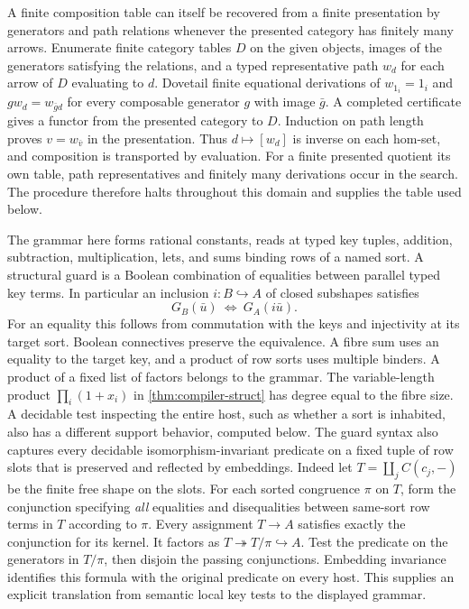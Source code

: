 \documentclass[11pt,a4paper]{article}
\theoremstyle{definition}
\theoremstyle{remark}\newaliascnt{remark}{theorem}
\numberwithin{equation}{section}
\begin{document}
A finite composition table can itself be recovered from a finite presentation by generators and path relations whenever the presented category has finitely many arrows. Enumerate finite category tables $D$ on the given objects, images of the generators satisfying the relations, and a typed representative path $w_d$ for each arrow of $D$ evaluating to $d$. Dovetail finite equational derivations of $w_{1_i}=1_i$ and $g w_d=w_{\bar g d}$ for every composable generator $g$ with image $\bar g$. A completed certificate gives a functor from the presented category to $D$. Induction on path length proves $v=w_{\bar v}$ in the presentation. Thus $d\mapsto[w_d]$ is inverse on each hom-set, and composition is transported by evaluation. For a finite presented quotient its own table, path representatives and finitely many derivations occur in the search. The procedure therefore halts throughout this domain and supplies the table used below.

The grammar here forms rational constants, reads at typed key tuples, addition, subtraction, multiplication, lets, and sums binding rows of a named sort. A structural guard is a Boolean combination of equalities between parallel typed key terms. In particular an inclusion \(i:B\hookrightarrow A\) of closed subshapes satisfies
\[
                    G_B(\bar u)\ \Longleftrightarrow\ G_A(i\bar u).
\]
For an equality this follows from commutation with the keys and injectivity at its target sort. Boolean connectives preserve the equivalence. A fibre sum uses an equality to the target key, and a product of row sorts uses multiple binders. A product of a fixed list of factors belongs to the grammar. The variable-length product \(\prod_i(1+x_i)\) in \cref{thm:compiler-struct} has degree equal to the fibre size. A decidable test inspecting the entire host, such as whether a sort is inhabited, also has a different support behavior, computed below.
The guard syntax also captures every decidable isomorphism-invariant predicate on a fixed tuple of row slots that is preserved and reflected by embeddings. Indeed let \(T=\coprod_j C(c_j,-)\) be the finite free shape on the slots. For each sorted congruence \(\pi\) on \(T\), form the conjunction specifying \emph{all} equalities and disequalities between same-sort row terms in \(T\) according to \(\pi\). Every assignment \(T\to A\) satisfies exactly the conjunction for its kernel. It factors as \(T\twoheadrightarrow T/\pi\hookrightarrow A\). Test the predicate on the generators in \(T/\pi\), then disjoin the passing conjunctions. Embedding invariance identifies this formula with the original predicate on every host. This supplies an explicit translation from semantic local key tests to the displayed grammar.
\end{document}
